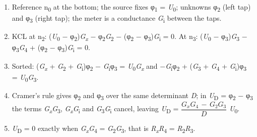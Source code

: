 \documentclass[11pt]{article}
\begin{document}
\begin{keepsection}
\begin{keepsection}
\begin{enumerate}
\item Reference n\textsubscript{0} at the bottom; the source fixes φ\textsubscript{1} = \textit{U}\textsubscript{0}; unknowns φ\textsubscript{2} (left tap) and φ\textsubscript{3} (right tap); the meter is a conductance \textit{G}\textsubscript{i} between the taps.
\item KCL at n\textsubscript{2}: (\textit{U}\textsubscript{0} \ensuremath{-} φ\textsubscript{2})\textit{G}\textsubscript{\textit{x}} \ensuremath{-} φ\textsubscript{2}\textit{G}\textsubscript{2} \ensuremath{-} (φ\textsubscript{2} \ensuremath{-} φ\textsubscript{3})\textit{G}\textsubscript{i} = 0. At n\textsubscript{3}: (\textit{U}\textsubscript{0} \ensuremath{-} φ\textsubscript{3})\textit{G}\textsubscript{3} \ensuremath{-} φ\textsubscript{3}\textit{G}\textsubscript{4} + (φ\textsubscript{2} \ensuremath{-} φ\textsubscript{3})\textit{G}\textsubscript{i} = 0.
\item Sorted: (\textit{G}\textsubscript{\textit{x}} + \textit{G}\textsubscript{2} + \textit{G}\textsubscript{i})φ\textsubscript{2} \ensuremath{-} \textit{G}\textsubscript{i}φ\textsubscript{3} = \textit{U}\textsubscript{0}\textit{G}\textsubscript{\textit{x}} and \ensuremath{-}\textit{G}\textsubscript{i}φ\textsubscript{2} + (\textit{G}\textsubscript{3} + \textit{G}\textsubscript{4} + \textit{G}\textsubscript{i})φ\textsubscript{3} = \textit{U}\textsubscript{0}\textit{G}\textsubscript{3}.
\item Cramer’s rule gives φ\textsubscript{2} and φ\textsubscript{3} over the same determinant \textit{D}; in \textit{U}\textsubscript{D} = φ\textsubscript{2} \ensuremath{-} φ\textsubscript{3} the terms \textit{G}\textsubscript{\textit{x}}\textit{G}\textsubscript{3}, \textit{G}\textsubscript{\textit{x}}\textit{G}\textsubscript{i} and \textit{G}\textsubscript{3}\textit{G}\textsubscript{i} cancel, leaving \textit{U}\textsubscript{D} = {\small\ensuremath{\dfrac{{G}_{{x}}{G}_{4}\, -\, {G}_{2}{G}_{3}}{{D}}}} \textit{U}\textsubscript{0}.
\item \textit{U}\textsubscript{D} = 0 exactly when \textit{G}\textsubscript{\textit{x}}\textit{G}\textsubscript{4} = \textit{G}\textsubscript{2}\textit{G}\textsubscript{3}, that is \textit{R}\textsubscript{\textit{x}}\textit{R}\textsubscript{4} = \textit{R}\textsubscript{2}\textit{R}\textsubscript{3}.
\end{enumerate}


\end{keepsection}
\end{keepsection}
\end{document}
